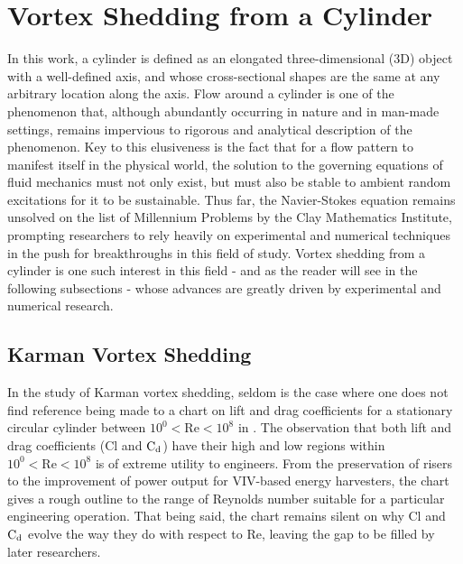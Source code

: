 \documentclass[oneside]{utmthesis}
\begin{document}
\section{Vortex Shedding from a Cylinder}
In this work, a cylinder is defined as an elongated three-dimensional (3D) object with a well-defined axis, and whose cross-sectional shapes are the same at any arbitrary location along the axis. Flow around a cylinder is one of the phenomenon that, although abundantly occurring in nature and in man-made settings, remains impervious to rigorous and analytical description of the phenomenon. Key to this elusiveness is the fact that for a flow pattern to manifest itself in the physical world, the solution to the governing equations of fluid mechanics must not only exist, but must also be stable to ambient random excitations for it to be sustainable. Thus far, the Navier-Stokes equation remains unsolved on the list of Millennium Problems by the Clay Mathematics Institute, prompting researchers to rely heavily on experimental and numerical techniques in the push for breakthroughs in this field of study. Vortex shedding from a cylinder is one such interest in this field - and as the reader will see in the following subsections - whose advances are greatly driven by experimental and numerical research.

\subsection{Karman Vortex Shedding} \label{ssec:kvShedding}
In the study of Karman vortex shedding, seldom is the case where one does not find reference being made to a chart on lift and drag coefficients for a stationary circular cylinder between $10^{0} < \text{Re} < 10^{8}$ in \citet{Zdravkovich1997}. The observation that both lift and drag coefficients (Cl and $\text{C}_{\text{d}}$) have their high and low regions within $10^{0} < \text{Re} < 10^{8}$ is of extreme utility to engineers. From the preservation of risers to the improvement of power output for VIV-based energy harvesters, the chart gives a rough outline to the range of Reynolds number suitable for a particular engineering operation. That being said, the chart remains silent on why Cl and $\text{C}_{\text{d}}$ evolve the way they do with respect to Re, leaving the gap to be filled by later researchers.
\end{document}
